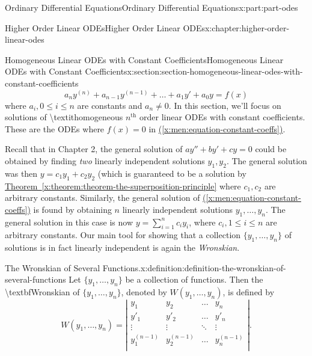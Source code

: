 \documentclass[twoside,10pt,]{book}
\newcommand{\xreffont}{\relax}
\numberwithin{equation}{part}
\renewcommand{\th}{\text{th}}
\newcommand{\amp}{&}
\begin{document}
\begin{partptx}{Ordinary Differential Equations}{}{Ordinary Differential Equations}{}{}{x:part:part-odes}
\begin{chapterptx}{Higher Order Linear ODEs}{}{Higher Order Linear ODEs}{}{}{x:chapter:higher-order-linear-odes}
\begin{sectionptx}{Homogeneous Linear ODEs with Constant Coefficients}{}{Homogeneous Linear ODEs with Constant Coefficients}{}{}{x:section:section-homogeneous-linear-odes-with-constant-coefficients}
\begin{equation}
a_{n}y^{(n)}+a_{n-1}y^{(n-1)}+\dots+a_{1}y'+a_{0}y=f(x)\label{x:men:equation-constant-coeffs}
\end{equation}
where \(a_{i},0\leq i\leq n\) are constants and \(a_{n}\neq0\). In this section, we'll focus on solutions of \textbackslash{}textit\textbraceleft{}homogeneous\textbraceright{} \(n^{\th}\) order linear ODEs with constant coefficients. These are the ODEs where \(f(x) = 0\) in \hyperref[x:men:equation-constant-coeffs]{({\xreffont\ref{x:men:equation-constant-coeffs}})}.%
\par
Recall that in Chapter 2, the general solution of \(ay''+by'+cy=0\) could be obtained by finding \emph{two} linearly independent solutions \(y_{1},y_{2}\). The general solution was then \(y = c_{1}y_{1}+c_{2}y_{2}\) (which is guaranteed to be a solution by \hyperref[x:theorem:theorem-the-superposition-principle]{Theorem~{\xreffont\ref{x:theorem:theorem-the-superposition-principle}}} where \(c_{1},c_{2}\) are arbitrary constants. Similarly, the general solution of \hyperref[x:men:equation-constant-coeffs]{({\xreffont\ref{x:men:equation-constant-coeffs}})} is found by obtaining \(n\) linearly independent solutions \(y_{1},\dots,y_{n}\). The general solution in this case is now \(y = \sum_{i=1}^{n}c_{i}y_{i}\), where \(c_{i},1\leq i\leq n\) are arbitrary constants. Our main tool for showing that a collection \(\{y_{1},\dots,y_{n}\}\) of solutions is in fact linearly independent is again the \emph{Wronskian}.%
\begin{definition}{The Wronskian of Several Functions.}{x:definition:definition-the-wronskian-of-several-functions}%
%
 Let \(\{y_{1},\dots,y_{n}\}\) be a collection of functions. Then the \textbackslash{}textbf\textbraceleft{}Wronskian\textbraceright{} of \(\{y_{1},\dots,y_{n}\}\), denoted by \(W(y_{1},\dots,y_{n})\), is defined by%
\begin{equation*}
W(y_{1},\dots,y_{n}) = \left|\begin{array}{cccc}
y_{1} \amp y_{2} \amp \dots   \amp y_{n}   \\
y'_{1}  \amp y'_{2}  \amp \dots   \amp y'_{n}  \\
\vdots  \amp \vdots  \amp \ddots  \amp \vdots  \\
y^{(n-1)}_{1} \amp y^{(n-1)}_{2} \amp \dots   \amp y^{(n-1)}_{n} \\
\end{array}\right|.
\end{equation*}

\end{definition}
\end{sectionptx}
\end{chapterptx}
\end{partptx}
\end{document}
